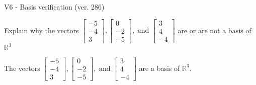 \begin{exercise}
  \begin{exerciseTitle}V6 - Basis verification (ver. 286)\end{exerciseTitle}
  \begin{exerciseStatement}
    Explain why the vectors \(\left[\begin{array}{r}
-5 \\
-4 \\
3
\end{array}\right] , \left[\begin{array}{r}
0 \\
-2 \\
-5
\end{array}\right] , \text{ and } \left[\begin{array}{r}
3 \\
4 \\
-4
\end{array}\right]\) are or are not a basis of \(\mathbb{R}^3\)	


  \end{exerciseStatement}
  \begin{exerciseAnswer}
   The vectors \(\left[\begin{array}{r}
-5 \\
-4 \\
3
\end{array}\right] , \left[\begin{array}{r}
0 \\
-2 \\
-5
\end{array}\right] , \text{ and } \left[\begin{array}{r}
3 \\
4 \\
-4
\end{array}\right]\) 
  	 are  a basis of \(\mathbb{R}^3\).
  


  \end{exerciseAnswer}
\end{exercise}